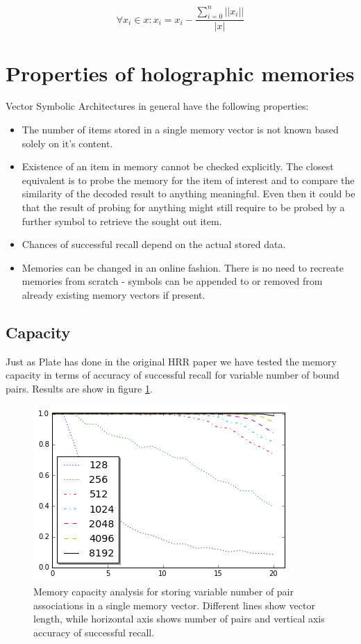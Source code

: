 \documentclass[conference]{IEEEtran}
\begin{document}
	\[ \forall x_i \in x: x_i = x_i - \frac{\sum_{i=0}^n ||x_i||}{|x|} \]
	
	\section{Properties of holographic memories}
	
	Vector Symbolic Architectures in general have the following properties:
	\begin{itemize}
		\item The number of items stored in a single memory vector is not known based solely on it's content.
		\item Existence of an item in memory cannot be checked explicitly. The closest equivalent is to probe the memory for the item of interest and to compare the similarity of the decoded result to anything meaningful. Even then it could be that the result of probing for anything might still require to be probed by a further symbol to retrieve the sought out item.
		\item Chances of successful recall depend on the actual stored data.
		\item Memories can be changed in an online fashion. There is no need to recreate memories from scratch - symbols can be appended to or removed from already existing memory vectors if present.
	\end{itemize}
	
	\subsection{Capacity}
	
	Just as Plate has done in the original HRR paper \cite{Plate:1995:HolographicReducedRepresentations} we have tested the memory capacity in terms of accuracy of successful recall for variable number of bound pairs. Results are show in figure \ref{fig:capacity}.
	
		\begin{figure}[th!]
			\center
			\includegraphics[width=0.8\columnwidth]{img/capacity.png}
			\caption{Memory capacity analysis for storing variable number of pair associations in a single memory vector. Different lines show vector length, while horizontal axis shows number of pairs and vertical axis accuracy of successful recall.}
			\label{fig:capacity}
		\end{figure}
	
\end{document}
